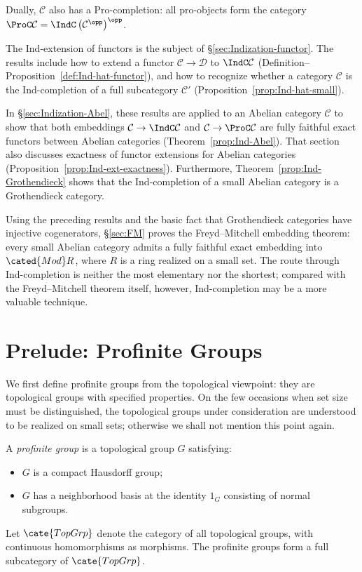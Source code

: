 Dually, $\mathcal{C}$ also has a Pro-completion: all pro-objects form the category
$\ProC\mathcal{C}=\IndC\left(\mathcal{C}^{\opp}\right)^{\opp}$.

The Ind-extension of functors is the subject of \S\ref{sec:Indization-functor}. The results include how to extend a functor $\mathcal{C}\to\mathcal{D}$ to $\IndC\mathcal{C}$ (Definition--Proposition~\ref{def:Ind-hat-functor}), and how to recognize whether a category $\mathcal{C}$ is the Ind-completion of a full subcategory $\mathcal{C}'$ (Proposition~\ref{prop:Ind-hat-small}).

In \S\ref{sec:Indization-Abel}, these results are applied to an Abelian category $\mathcal{C}$ to show that both embeddings
$\mathcal{C}\to\IndC\mathcal{C}$ and $\mathcal{C}\to\ProC\mathcal{C}$ are fully faithful exact functors between Abelian categories (Theorem~\ref{prop:Ind-Abel}). That section also discusses exactness of functor extensions for Abelian categories (Proposition~\ref{prop:Ind-ext-exactness}). Furthermore, Theorem~\ref{prop:Ind-Grothendieck} shows that the Ind-completion of a small Abelian category is a Grothendieck category.

Using the preceding results and the basic fact that Grothendieck categories have injective cogenerators, \S\ref{sec:FM} proves the Freyd--Mitchell embedding theorem: every small Abelian category admits a fully faithful exact embedding into $\cated{Mod}R$, where $R$ is a ring realized on a small set. The route through Ind-completion is neither the most elementary nor the shortest; compared with the Freyd--Mitchell theorem itself, however, Ind-completion may be a more valuable technique.

\section{Prelude: Profinite Groups}\label{sec:profinite-groups}
We first define profinite groups from the topological viewpoint: they are topological groups with specified properties. On the few occasions when set size must be distinguished, the topological groups under consideration are understood to be realized on small sets; otherwise we shall not mention this point again.

\begin{definition}\label{def:profinite-group}
	A \emph{profinite group} is a topological group $G$ satisfying:
	\begin{itemize}
		\item $G$ is a compact Hausdorff group;
		\item $G$ has a neighborhood basis at the identity $1_G$ consisting of normal subgroups.
	\end{itemize}

	Let $\cate{TopGrp}$ denote the category of all topological groups, with continuous homomorphisms as morphisms. The profinite groups form a full subcategory of $\cate{TopGrp}$.
\end{definition}

